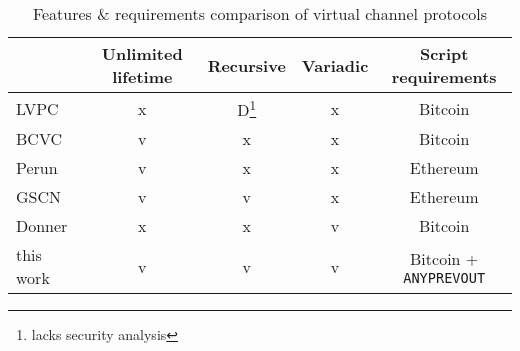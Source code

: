   \begin{table*}
    \caption{Features \& requirements comparison of virtual channel protocols}
    \label{table:comparison-features}
    \begin{minipage}{\textwidth}
    \begin{center}
    \begin{tabular}{|l|c|c|c|c|}
    \hline
              & Unlimited lifetime & Recursive & Variadic & Script requirements \\
    \hline
    LVPC~\cite{10.1007/978-3-030-65411-5_18}
              & x                  & D\footnote{lacks security analysis}
                                               & x         & Bitcoin \\
    \hline
    BCVC~\cite{cryptoeprint:2020:554}
              & v                  & x         & x         & Bitcoin \\
    \hline
    Perun~\cite{perun}
              & v                  & x         & x         & Ethereum \\
    \hline
    GSCN~\cite{DBLP:conf/ccs/DziembowskiFH18}
              & v                  & v         & x         & Ethereum \\
    \hline
    Donner~\cite{donner}
              & x                  & x         & v         & Bitcoin \\
    \hline
    this work & v                  & v         & v         & Bitcoin + \texttt{ANYPREVOUT} \\
    \hline
    \end{tabular}
    \end{center}
    \end{minipage}
  \end{table*}
